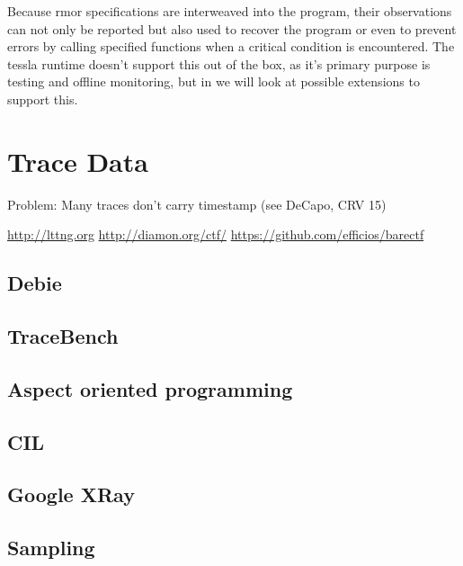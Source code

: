 Because \gls{rmor} specifications are interweaved into the program, their observations can not only be reported but also used to recover the program or even to prevent errors by calling specified functions when a critical condition is encountered.
The \gls{tessla} runtime doesn't support this out of the box, as it's primary purpose is testing and offline monitoring, but in  we will look at possible extensions to support this.


\section{Trace Data}
\label{sec:system:traces}

Problem: Many traces don't carry timestamp (see DeCapo, CRV 15)

\url{http://lttng.org}
\url{http://diamon.org/ctf/}
\url{https://github.com/efficios/barectf}
\subsection{Debie}
\subsection{TraceBench}
\subsection{Aspect oriented programming}
\subsection{CIL}
\subsection{Google XRay}
\subsection{Sampling}
